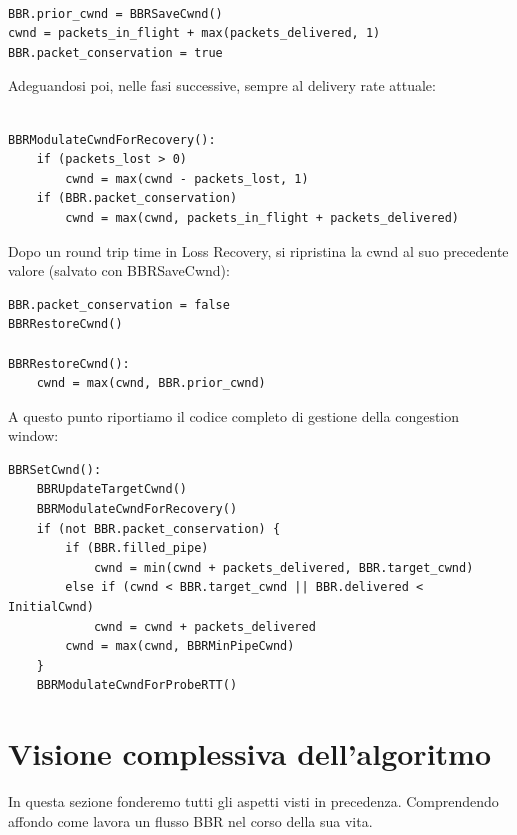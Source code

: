 \begin{lstlisting}[caption=BBR enter in loss recovery]

BBR.prior_cwnd = BBRSaveCwnd()
cwnd = packets_in_flight + max(packets_delivered, 1)
BBR.packet_conservation = true

\end{lstlisting}

Adeguandosi poi, nelle fasi successive, sempre al delivery rate attuale:

\begin{lstlisting}[caption=BBRModulateCwndForRecovery]

BBRModulateCwndForRecovery():
	if (packets_lost > 0)
   		cwnd = max(cwnd - packets_lost, 1)
	if (BBR.packet_conservation)
    	cwnd = max(cwnd, packets_in_flight + packets_delivered)

\end{lstlisting}

Dopo un round trip time in Loss Recovery, si ripristina la cwnd al suo precedente valore (salvato con BBRSaveCwnd):

\begin{lstlisting}[caption=BBR exit from loss recovery]
BBR.packet_conservation = false
BBRRestoreCwnd()

BBRRestoreCwnd():
	cwnd = max(cwnd, BBR.prior_cwnd)

\end{lstlisting}

A questo punto riportiamo il codice completo di gestione della congestion window:

\begin{lstlisting}[caption=BBRSetCwnd]
BBRSetCwnd():
	BBRUpdateTargetCwnd()
	BBRModulateCwndForRecovery()
	if (not BBR.packet_conservation) {
   		if (BBR.filled_pipe)
        	cwnd = min(cwnd + packets_delivered, BBR.target_cwnd)
		else if (cwnd < BBR.target_cwnd || BBR.delivered < InitialCwnd)
			cwnd = cwnd + packets_delivered
		cwnd = max(cwnd, BBRMinPipeCwnd)
    }
	BBRModulateCwndForProbeRTT()

\end{lstlisting}

\section{Visione complessiva dell'algoritmo}

In questa sezione fonderemo tutti gli aspetti visti in precedenza. Comprendendo affondo come lavora un flusso BBR nel corso della sua vita. \bigskip

